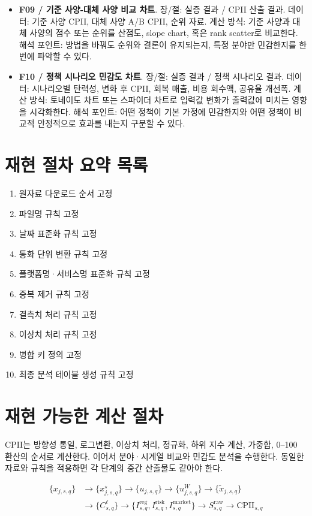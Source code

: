 \documentclass[11pt,a4paper]{report}
\newenvironment{summarylist}{\begin{itemize}[leftmargin=1.8em,itemsep=0.35em,topsep=0.35em]\RaggedRight}{\end{itemize}}
\begin{document}
\begin{summarylist}
  \item \textbf{F09 / 기준 사양-대체 사양 비교 차트}. 장/절: 실증 결과 / CPII 산출 결과. 데이터: 기준 사양 CPII, 대체 사양 A/B CPII, 순위 자료. 계산 방식: 기준 사양과 대체 사양의 점수 또는 순위를 산점도, slope chart, 혹은 rank scatter로 비교한다. 해석 포인트: 방법을 바꿔도 순위와 결론이 유지되는지, 특정 분야만 민감한지를 한 번에 파악할 수 있다.
  \item \textbf{F10 / 정책 시나리오 민감도 차트}. 장/절: 실증 결과 / 정책 시나리오 결과. 데이터: 시나리오별 탄력성, 변화 후 CPII, 회복 매출, 비용 회수액, 공유율 개선폭. 계산 방식: 토네이도 차트 또는 스파이더 차트로 입력값 변화가 출력값에 미치는 영향을 시각화한다. 해석 포인트: 어떤 정책이 기본 가정에 민감한지와 어떤 정책이 비교적 안정적으로 효과를 내는지 구분할 수 있다.
\end{summarylist}
\endgroup

\section{재현 절차 요약 목록}
\begin{enumerate}[label=\arabic*.]
  \item 원자료 다운로드 순서 고정
  \item 파일명 규칙 고정
  \item 날짜 표준화 규칙 고정
  \item 통화 단위 변환 규칙 고정
  \item 플랫폼명·서비스명 표준화 규칙 고정
  \item 중복 제거 규칙 고정
  \item 결측치 처리 규칙 고정
  \item 이상치 처리 규칙 고정
  \item 병합 키 정의 고정
  \item 최종 분석 테이블 생성 규칙 고정
\end{enumerate}

\section{재현 가능한 계산 절차}
CPII는 방향성 통일, 로그변환, 이상치 처리, 정규화, 하위 지수 계산, 가중합, 0--100 환산의 순서로 계산한다. 이어서 분야·시계열 비교와 민감도 분석을 수행한다. 동일한 자료와 규칙을 적용하면 각 단계의 중간 산출물도 같아야 한다.

\begin{equation}
\label{eq:cpii_pipeline}
\begin{aligned}
\{x_{j,s,q}\} &\rightarrow \{x^{\star}_{j,s,q}\} \rightarrow \{u_{j,s,q}\} \rightarrow \{u^{W}_{j,s,q}\} \rightarrow \{\widetilde{x}_{j,s,q}\} \\
&\rightarrow \{C^{\ell}_{s,q}\} \rightarrow \{I^{\mathrm{reg}}_{s,q}, I^{\mathrm{risk}}_{s,q}, I^{\mathrm{market}}_{s,q}\} \rightarrow S^{\mathrm{raw}}_{s,q} \rightarrow \mathrm{CPII}_{s,q}
\end{aligned}
\end{equation}
\end{document}
